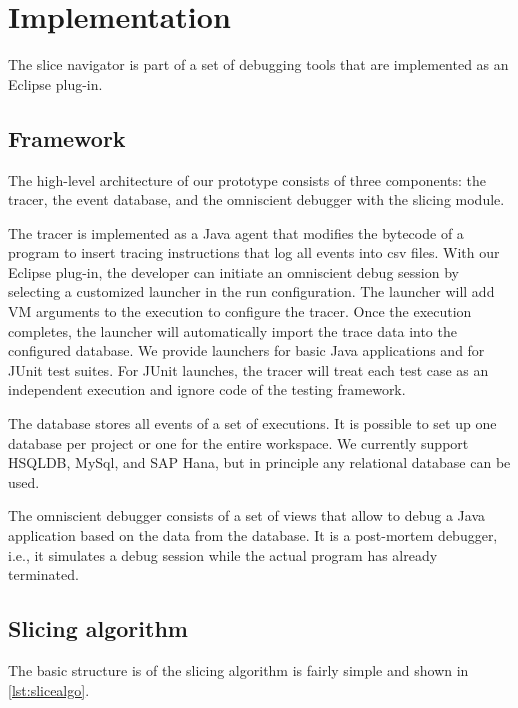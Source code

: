 ﻿\documentclass[
      english,
      ]{llncs}
\begin{document}
\section{Implementation}
\label{sec:impl}

The slice navigator is part of a set of debugging tools that are implemented as an Eclipse plug-in.

\subsection{Framework}

The high-level architecture of our prototype consists of three components: the tracer, the event database, and the omniscient debugger with the slicing module.

The tracer is implemented as a Java agent that modifies the bytecode of a program to insert tracing instructions that log all events into csv files.
With our Eclipse plug-in, the developer can initiate an omniscient debug session by selecting a customized launcher in the run configuration.
The launcher will add VM arguments to the execution to configure the tracer.
Once the execution completes, the launcher will automatically import the trace data into the configured database.
We provide launchers for basic Java applications and for JUnit test suites.
For JUnit launches, the tracer will treat each test case as an independent execution and ignore code of the testing framework.

The database stores all events of a set of executions.
It is possible to set up one database per project or one for the entire workspace.
We currently support HSQLDB, MySql, and SAP Hana, but in principle any relational database can be used.

The omniscient debugger consists of a set of views that allow to debug a Java application based on the data from the database.
It is a post-mortem debugger, i.e., it simulates a debug session while the actual program has already terminated.

\subsection{Slicing algorithm}

The basic structure is of the slicing algorithm is fairly simple and shown in \cref{lst:slicealgo}.
\end{document}
